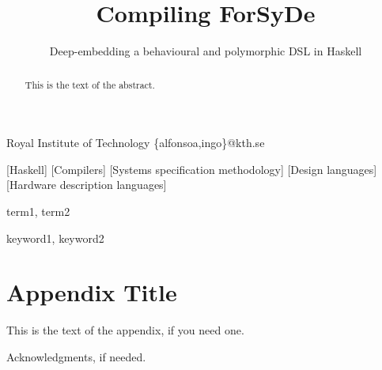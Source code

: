 \documentclass[preprint,natbib]{sigplanconf}
\begin{document}

\preprintfooter{}                                             %

\title{Compiling ForSyDe}
\subtitle{Deep-embedding a behavioural and polymorphic DSL in Haskell}

           {Royal Institute of Technology}
           {\{alfonsoa,ingo\}@kth.se}

\maketitle

\begin{abstract}
This is the text of the abstract.
\end{abstract}

[Haskell]
[Compilers]
[Systems specification methodology]
[Design languages]
[Hardware description languages]

\terms
term1, term2

\keywords
keyword1, keyword2









\appendix
\section{Appendix Title}

This is the text of the appendix, if you need one.

\acks

Acknowledgments, if needed.



\end{document}
